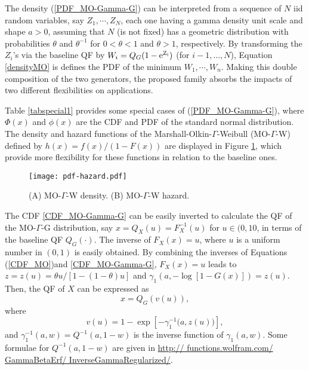 \documentclass[12pt,a4paper]{article} %
\begin{document}
The density (\ref{PDF_MO-Gamma-G}) can be interpreted from a sequence of $N$ iid random variables, say $Z_1,\cdots,Z_N$,
each one having a gamma density unit scale and shape $a>0$, assuming that $N$ (is not fixed) has a geometric
distribution with probabilities $\theta$ and $\theta^{-1}$ for $0<\theta<1$ and $\theta>1$,
respectively. By transforming the $Z_i$'s via the baseline QF by $W_i=Q_G(1-\rm{e}^{Z_i})$
(for $i-1,\ldots,N$), Equation \eqref{densityMO} is defines the PDF of the minimum $W_1,\cdots,W_n$.
Making this double composition of the two generators, the proposed family absorbs the impacts of two different flexibilities
on applications.


Table \ref{tabspecial1} provides some special cases of (\ref{PDF_MO-Gamma-G}), where
$\Phi(x)$ and $\phi(x)$ are the CDF and PDF of the standard normal distribution. The density and hazard functions
of the Marshall-Olkin-$\Gamma$-Weibull (MO-$\Gamma$-W) defined by $h(x) = f(x)/(1-F(x))$ are displayed in Figure \ref{formas}, which provide
more flexibility for these functions in relation to the baseline ones.

\vspace{0.6cm}

\begin{figure}[H]
\begin{center}
\texttt{[image: pdf-hazard.pdf]}
\caption{(A) MO-$\Gamma$-W density. (B) MO-$\Gamma$-W hazard.\label{formas}}
\end{center}
\end{figure}

\vspace{0.6cm}

The CDF \eqref{CDF_MO-Gamma-G} can be easily inverted to calculate the QF of the MO-$\Gamma$-G distribution,
say $x=Q_{X}(u)=F_X^{-1}(u)$ for $u \in (0,10$, in terms of the baseline QF $Q_G(\cdot)$. The inverse of
$F_{X}(x)=u$, where $u$ is a uniform number in $(0,1)$ is easily obtained. By combining the inverses
of Equations (\ref{CDF_MO})and \eqref{CDF_MO-Gamma-G}, $F_{X}(x)=u$ leads to
$z=z(u)=\theta u/[1-(1-\theta)u]$ and $\gamma_{1}\left(a, -\log[1-G(x)]\right)=z(u)$.
Then, the QF of $X$ can be expressed as
$$x=Q_G\left(v(u)\right),$$
where
$$v(u)=1-\exp\left[-\gamma_1^{-1}\big(a,z(u)\big)\right],$$
and $\gamma_1^{-1}(a,w)=Q^{-1}(a,1-w)$ is the inverse function of $\gamma_1(a,w)$. Some formulae for
$Q^{-1}(a,1-w)$ are given in \url{http:// functions.wolfram.com/ GammaBetaErf/ InverseGammaRegularized/}.
\end{document}
